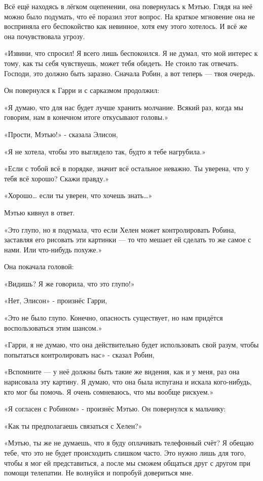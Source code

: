 \documentclass[a5paper, 9pt,
final, openany, twoside=true]{memoir}
\begin{document}
Всё ещё находясь в лёгком оцепенении, она повернулась к Мэтью. Глядя на неё можно было подумать, что её поразил этот вопрос. На краткое мгновение она не восприняла его беспокойство как невинное, хотя ему этого хотелось. И всё же она почувствовала угрозу.

«Извини, что спросил! Я всего лишь беспокоился. Я не думал, что мой интерес к тому, как ты себя чувствуешь, может тебя обидеть. Не стоило так отвечать. Господи, это должно быть заразно. Сначала Робин, а вот теперь — твоя очередь.

Он повернулся к Гарри и с сарказмом продолжил:

«Я думаю, что для нас будет лучше хранить молчание. Всякий раз, когда мы говорим, нам в конечном итоге откусывают головы.»

«Прости, Мэтью!» - сказала Элисон,

«Я не хотела, чтобы это выглядело так, будто я тебе нагрубила.»

«Если с тобой всё в порядке, значит всё остальное неважно. Ты уверена, что у тебя всё хорошо? Скажи правду.»

«Хорошо… если ты уверен, что хочешь знать…»

Мэтью кивнул в ответ.

«Это глупо, но я подумала, что если Хелен может контролировать Робина, заставляя его рисовать эти картинки — то что мешает ей сделать то же самое с нами. Или что-нибудь похуже.»

Она покачала головой:

«Видишь? Я же говорила, что это глупо!»

«Нет, Элисон» - произнёс Гарри,

«Это не было глупо. Конечно, опасность существует, но нам придётся воспользоваться этим шансом.»

«Гарри, я не думаю, что она действительно будет использовать свой разум, чтобы попытаться контролировать нас» - сказал Робин,

«Вспомните — у неё должны быть такие же видения, как и у меня, раз она нарисовала эту картину. Я думаю, что она была испугана и искала кого-нибудь, кто мог бы помочь. Я очень сомневаюсь, что мы вообще рискуем.»

«Я согласен с Робином» - произнёс Мэтью. Он повернулся к мальчику:

«Как ты предполагаешь связаться с Хелен?»

«Мэтью, ты же не думаешь, что я буду оплачивать телефонный счёт? Я обещаю тебе, что это не будет происходить слишком часто. Это нужно лишь для того, чтобы я мог ей представиться, а после мы сможем общаться друг с другом при помощи телепатии. Не волнуйся и попробуй довериться мне.
\end{document}
